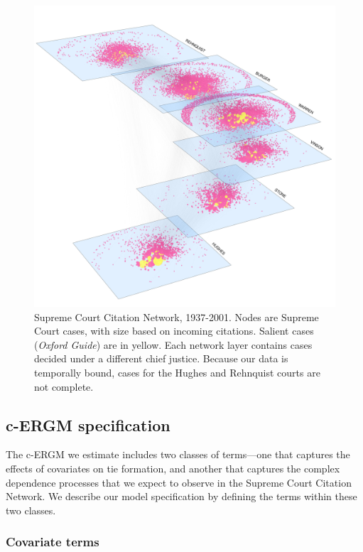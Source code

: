 \documentclass[headsepline=true, abstracton]{scrartcl}
\begin{document}
\begin{figure}[htp]
\includegraphics[scale=0.35,clip=true,trim=.5cm 0cm 0cm 2cm]{images/citations1}
\caption{ Supreme Court Citation Network, 1937-2001. Nodes are Supreme Court cases, with size based on incoming citations. Salient cases ({\em Oxford Guide}) are in yellow. Each network layer contains cases decided under a different chief justice. Because our data is temporally bound, cases for the Hughes and Rehnquist courts are not complete. }
 \label{fig:networkviz}
\vspace{-.25cm}
\end{figure}


\subsection{c-ERGM specification}

The c-ERGM we estimate includes two classes of terms---one that captures the effects of covariates on tie formation, and another that captures the complex dependence processes that we expect to observe in the Supreme Court Citation Network. We describe our model specification by defining the terms within these two classes.


\subsubsection{Covariate terms}\label{covariate_terms}
\end{document}
